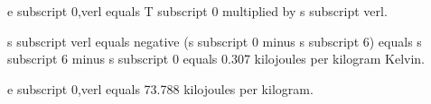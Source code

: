 e subscript 0,verl equals T subscript 0 multiplied by s subscript verl.  

s subscript verl equals negative (s subscript 0 minus s subscript 6) equals s subscript 6 minus s subscript 0 equals 0.307 kilojoules per kilogram Kelvin.  

e subscript 0,verl equals 73.788 kilojoules per kilogram.